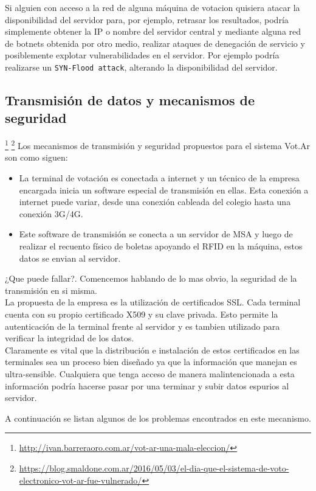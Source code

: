 Si alguien con acceso a la red de alguna máquina de votacion quisiera atacar la disponibilidad del servidor para, por ejemplo, retrasar los resultados, podría simplemente obtener la IP o nombre del servidor central y mediante alguna red de botnets obtenida por otro medio, realizar ataques de denegación de servicio y posiblemente explotar vulnerabilidades en el servidor. Por ejemplo podría realizarse un \texttt{SYN-Flood attack}, alterando la disponibilidad del servidor.


\subsection{Transmisión de datos y mecanismos de seguridad}
\footnote{\url{http://ivan.barreraoro.com.ar/vot-ar-una-mala-eleccion/}}
\footnote{\url{https://blog.smaldone.com.ar/2016/05/03/el-dia-que-el-sistema-de-voto-electronico-vot-ar-fue-vulnerado/}}
Los mecanismos de transmisión y seguridad propuestos para el sistema Vot.Ar son como siguen:
\begin{itemize}
	\item La terminal de votación es conectada a internet y un técnico de la empresa encargada inicia un software especial de transmisión en ellas. Esta conexión a internet puede variar, desde una conexión cableada del colegio hasta una conexión 3G/4G.
	\item Este software de transmisión se conecta a un servidor de MSA y luego de realizar el recuento físico de boletas apoyando el RFID en la máquina, estos datos se envian al servidor.
\end{itemize}

¿Que puede fallar?. Comencemos hablando de lo mas obvio, la seguridad de la transmisión en si misma.\\
La propuesta de la empresa es la utilización de certificados SSL. Cada terminal cuenta con su propio certificado X509 y su clave privada. Esto permite la autenticación de la terminal frente al servidor y es tambien utilizado para verificar la integridad de los datos.\\

Claramente es vital que la distribución e instalación de estos certificados en las terminales sea un proceso bien diseñado ya que la información que manejan es ultra-sensible. Cualquiera que tenga acceso de manera malintencionada a esta información podría hacerse pasar por una terminar y subir datos espurios al servidor.

A continuación se listan algunos de los problemas encontrados en este mecanismo.

